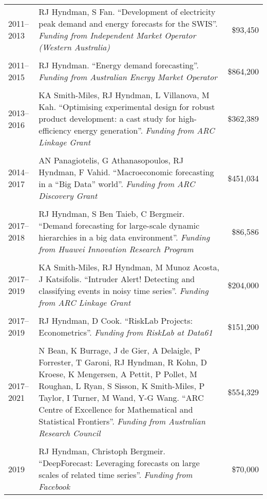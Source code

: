 \documentclass[10pt,a4paper,]{article}
\begin{document}
\begin{tabular}{lp{13.3cm}r}
   \\[-0.2cm]2011--2013 & RJ Hyndman, S Fan. ``Development of electricity peak demand and energy forecasts for the SWIS''. \emph{Funding from Independent Market Operator (Western Australia)} & \$93,450 \\ 
   \\[-0.2cm]2011--2015 & RJ Hyndman. ``Energy demand forecasting''. \emph{Funding from Australian Energy Market Operator} & \$864,200 \\ 
   \\[-0.2cm]2013--2016 & KA Smith-Miles, RJ Hyndman, L Villanova, M Kah. ``Optimising experimental design for robust product development: a cast study for high-efficiency energy generation''. \emph{Funding from ARC Linkage Grant} & \$362,389 \\ 
   \\[-0.2cm]2014--2017 & AN Panagiotelis, G Athanasopoulos, RJ Hyndman, F Vahid. ``Macroeconomic forecasting in a “Big Data” world''. \emph{Funding from ARC Discovery Grant} & \$451,034 \\ 
   \\[-0.2cm]2017--2018 & RJ Hyndman, S Ben Taieb, C Bergmeir. ``Demand forecasting for large-scale dynamic hierarchies in a big data environment''. \emph{Funding from Huawei Innovation Research Program} & \$86,586 \\ 
   \\[-0.2cm]2017--2019 & KA Smith-Miles, RJ Hyndman, M Munoz Acosta, J Katsifolis. ``Intruder Alert! Detecting and classifying events in noisy time series''. \emph{Funding from ARC Linkage Grant} & \$204,000 \\ 
   \\[-0.2cm]2017--2019 & RJ Hyndman, D Cook. ``RiskLab Projects: Econometrics''. \emph{Funding from RiskLab at Data61} & \$151,200 \\ 
   \\[-0.2cm]2017--2021 & N Bean, K Burrage, J de Gier, A Delaigle, P Forrester, T Garoni, RJ Hyndman, R Kohn, D Kroese, K Mengersen, A Pettit, P Pollet, M Roughan, L Ryan, S Sisson, K Smith-Miles, P Taylor, I Turner, M Wand, Y-G Wang. ``ARC Centre of Excellence for Mathematical and Statistical Frontiers''. \emph{Funding from Australian Research Council} & \$554,329 \\ 
   \\[-0.2cm]2019 & RJ Hyndman, Christoph Bergmeir. ``DeepForecast: Leveraging forecasts on large scales of related time series''. \emph{Funding from Facebook} & \$70,000 \\ 

\end{tabular}
\end{document}
